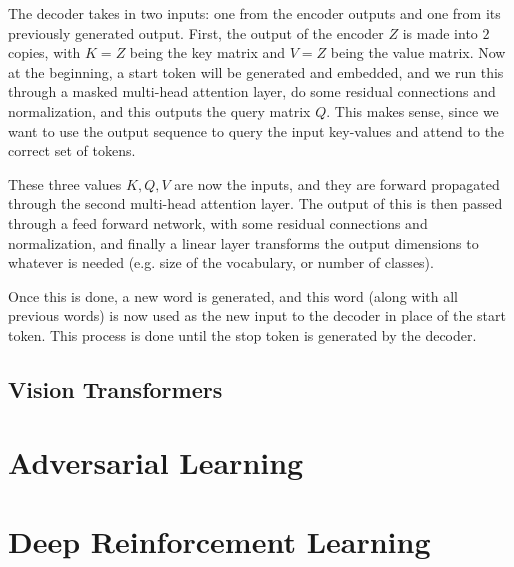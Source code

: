 \documentclass{article}
\begin{document}
    The decoder takes in two inputs: one from the encoder outputs and one from its previously generated output. First, the output of the encoder $Z$ is made into $2$ copies, with $K = Z$ being the key matrix and $V = Z$ being the value matrix. Now at the beginning, a start token will be generated and embedded, and we run this through a masked multi-head attention layer, do some residual connections and normalization, and this outputs the query matrix $Q$. This makes sense, since we want to use the output sequence to query the input key-values and attend to the correct set of tokens. 

    These three values $K, Q, V$ are now the inputs, and they are forward propagated through the second multi-head attention layer. The output of this is then passed through a feed forward network, with some residual connections and normalization, and finally a linear layer transforms the output dimensions to whatever is needed (e.g. size of the vocabulary, or number of classes). 

    Once this is done, a new word is generated, and this word (along with all previous words) is now used as the new input to the decoder in place of the start token. This process is done until the stop token is generated by the decoder. 


  \subsection{Vision Transformers} 

\section{Adversarial Learning}

\section{Deep Reinforcement Learning}





\end{document}
